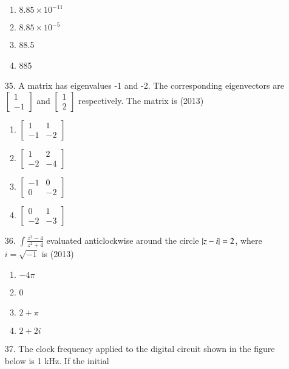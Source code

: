 \documentclass[journal]{IEEEtran}
\begin{document}
\begin{enumerate}
    \begin{enumerate}[label=(\Alph*)]
        \item  $8.85\times 10^{-11}$ 
        \item $8.85\times 10^{-5}$ 
        \item  88.5
        \item  885 
    \end{enumerate} 
    
    \item[35.] A matrix has eigenvalues -1 and -2. The corresponding eigenvectors are $\begin{bmatrix}1\\-1\end{bmatrix}$ and $\begin{bmatrix}1\\2\end{bmatrix}$ respectively. The matrix is \hfill (2013)
    \begin{enumerate}[label=(\Alph*)]
        \item $\begin{bmatrix}1&1\\-1&-2\end{bmatrix}$
        \item $\begin{bmatrix}1&2\\-2&-4\end{bmatrix}$
        \item $\begin{bmatrix}-1&0\\0&-2\end{bmatrix}$
        \item $\begin{bmatrix}0&1\\-2&-3\end{bmatrix}$
    \end{enumerate}
    \item[36.] $\int\frac{z^2-4}{z^2+4}$  evaluated anticlockwise around the circle $\left\vert z-i\right\vert=2$, where $i=\sqrt{-1}$ is \hfill (2013)
     \begin{enumerate}[label=(\Alph*)]
        \item $-4\pi$
        \item 0
        \item $2+\pi$
        \item $2+2i$
     \end{enumerate}
    \item[37.] The clock frequency applied to the digital circuit shown in the figure below is 1 kHz. If the initial

\end{enumerate}
\end{document}
